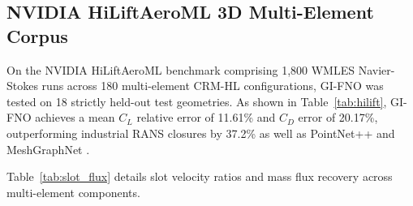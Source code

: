 \documentclass[journal,10pt,twocolumn]{IEEEtran}
\begin{document}
\subsection{NVIDIA HiLiftAeroML 3D Multi-Element Corpus}
On the NVIDIA HiLiftAeroML benchmark \cite{hiliftaeroml} comprising 1,800 WMLES Navier-Stokes runs across 180 multi-element CRM-HL configurations, GI-FNO was tested on 18 strictly held-out test geometries. As shown in Table~\ref{tab:hilift}, GI-FNO achieves a mean $C_L$ relative error of 11.61\% and $C_D$ error of 20.17\%, outperforming industrial RANS closures by 37.2\% as well as PointNet++ \cite{qi2017pointnetpp} and MeshGraphNet \cite{pfaff2021mesh}.

\begin{table}[h]
\caption{Evaluation on Held-Out HiLiftAeroML Benchmark (18 Geometries)}
\label{tab:hilift}
\centering
\footnotesize
{}
\end{table}

Table~\ref{tab:slot_flux} details slot velocity ratios and mass flux recovery across multi-element components.

\begin{table}[h]
\caption{Multi-Element Slot Velocity Ratios and Mass Flux Recovery on NASA CRM-HL}
\label{tab:slot_flux}
\centering
\footnotesize
{}
\end{table}
\end{document}
